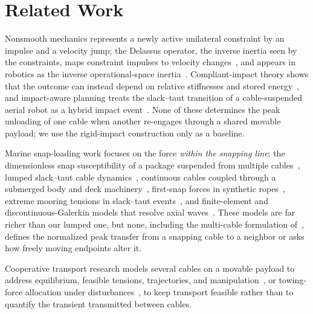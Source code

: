 \section{Related Work}
\label{sec:related}

Nonsmooth mechanics represents a newly active unilateral constraint by an impulse and a velocity jump; the Delassus operator, the inverse inertia seen by the constraints, maps constraint impulses to velocity changes~\cite{moreau1988unilateral,brogliato2016nonsmooth}, and appears in robotics as the inverse operational-space inertia~\cite{khatib1995inertial}. Compliant-impact theory shows that the outcome can instead depend on relative stiffnesses and stored energy~\cite{liu2008frictionless}, and impact-aware planning treats the slack--taut transition of a cable-suspended aerial robot as a hybrid impact event~\cite{wang2024impactaware}. None of these determines the peak unloading of one cable when another re-engages through a shared movable payload; we use the rigid-impact construction only as a baseline.

Marine snap-loading work focuses on the force \emph{within the snapping line}: the dimensionless snap susceptibility of a package suspended from multiple cables~\cite{niedzwecki1991snap}, lumped slack--taut cable dynamics~\cite{huang1993numerical}, continuous cables coupled through a submerged body and deck machinery~\cite{hann1995multicable}, first-snap forces in synthetic ropes~\cite{hennessey2005experimental}, extreme mooring tensions in slack--taut events~\cite{hsu2017snap,hann2015snatch,qiao2020snap}, and finite-element and discontinuous-Galerkin models that resolve axial waves~\cite{palm2017hpadaptive}. These models are far richer than our lumped one, but none, including the multi-cable formulation of~\cite{hann1995multicable}, defines the normalized peak transfer from a snapping cable to a neighbor or asks how freely moving endpoints alter it.

Cooperative transport research models several cables on a movable payload to address equilibrium, feasible tensions, trajectories, and manipulation~\cite{michael2009cooperative,sreenath2013dynamics}, or towing-force allocation under disturbances~\cite{du2021cooperative}, to keep transport feasible rather than to quantify the transient transmitted between cables.
